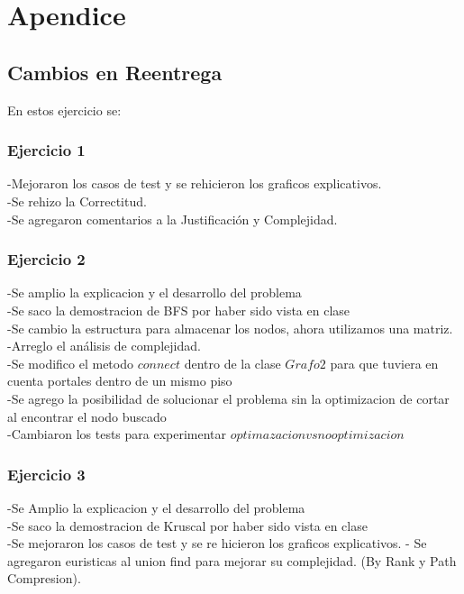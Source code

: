 \section{Apendice}
\subsection{Cambios en Reentrega}
    En estos ejercicio se:
\subsubsection{Ejercicio 1}
    -Mejoraron los casos de test y se rehicieron los graficos explicativos.\\
    -Se rehizo la Correctitud.\\
    -Se agregaron comentarios a la Justificaci\'on y Complejidad.
\subsubsection{Ejercicio 2}
    -Se amplio la explicacion y el desarrollo del problema\\
    -Se saco la demostracion de BFS por haber sido vista en clase\\
    -Se cambio la estructura para almacenar los nodos, ahora utilizamos una matriz.\\
    -Arreglo el an\'alisis de complejidad.\\
    -Se modifico el metodo $connect$ dentro de la clase $Grafo2$ para que tuviera en cuenta portales dentro de un mismo piso\\
    -Se agrego la posibilidad de solucionar el problema sin la optimizacion de cortar al encontrar el nodo buscado\\
    -Cambiaron los tests para experimentar $optimazacion vs no optimizacion$\\
\subsubsection{Ejercicio 3}
    -Se Amplio la explicacion y el desarrollo del problema\\
    -Se saco la demostracion de Kruscal por haber sido vista en clase\\
    -Se mejoraron los casos de test y se re hicieron los graficos explicativos.
    - Se agregaron euristicas al union find para mejorar su complejidad. (By Rank y Path Compresion).